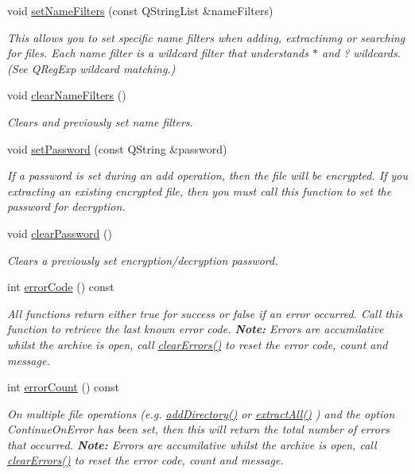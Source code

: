 \begin{DoxyCompactItemize}
void \hyperlink{class_ab_zip_a80724c61b6812aaea06f575860bed8e6}{set\+Name\+Filters} (const Q\+String\+List \&name\+Filters)
\begin{DoxyCompactList}\small\item\em This allows you to set specific name filters when adding, extractinmg or searching for files. Each name filter is a wildcard filter that understands $\ast$ and ? wildcards. (See Q\+Reg\+Exp wildcard matching.) \end{DoxyCompactList}\item 
void \hyperlink{class_ab_zip_a23197e4aeb30549b15adc0e8b5eaf239}{clear\+Name\+Filters} ()
\begin{DoxyCompactList}\small\item\em Clears and previously set name filters. \end{DoxyCompactList}\item 
void \hyperlink{class_ab_zip_a31f7636ca8c3ca66fd52b57c0f5b2328}{set\+Password} (const Q\+String \&password)
\begin{DoxyCompactList}\small\item\em If a password is set during an add operation, then the file will be encrypted. If you extracting an existing encrypted file, then you must call this function to set the password for decryption. \end{DoxyCompactList}\item 
void \hyperlink{class_ab_zip_afd354e102978d775abddf3263363c8d2}{clear\+Password} ()
\begin{DoxyCompactList}\small\item\em Clears a previously set encryption/decryption password. \end{DoxyCompactList}\item 
int \hyperlink{class_ab_zip_aed3be53eab7d843ca48943247b03d8c4}{error\+Code} () const 
\begin{DoxyCompactList}\small\item\em All functions return either true for success or false if an error occurred. Call this function to retrieve the last known error code. {\bfseries Note\+:} Errors are accumilative whilst the archive is open, call \hyperlink{class_ab_zip_a4e08361f95e0bc46aae1599232674230}{clear\+Errors()} to reset the error code, count and message. \end{DoxyCompactList}\item 
int \hyperlink{class_ab_zip_ae32a8a92d2cc267e2c57705e95fafc05}{error\+Count} () const 
\begin{DoxyCompactList}\small\item\em On multiple file operations (e.\+g. \hyperlink{class_ab_zip_ae4ad67e2d39ff729f648d12ec89b8ea0}{add\+Directory()} or \hyperlink{class_ab_zip_ac32a9ad3665fea51a0d3977e251ade73}{extract\+All()} ) and the option Continue\+On\+Error has been set, then this will return the total number of errors that occurred. {\bfseries Note\+:} Errors are accumilative whilst the archive is open, call \hyperlink{class_ab_zip_a4e08361f95e0bc46aae1599232674230}{clear\+Errors()} to reset the error code, count and message. \end{DoxyCompactList}\item 

\end{DoxyCompactItemize}
